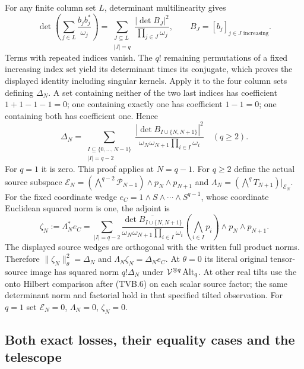 For any finite column set $L$, determinant multilinearity gives
\[
 \det\left(\sum_{j\in L}\frac{b_jb_j^*}{\omega_j}\right)
 =\sum_{\substack{J\subseteq L\\|J|=q}}
       \frac{|\det B_J|^2}{\prod_{j\in J}\omega_j},
 \qquad B_J=[b_j]_{j\in J\text{ increasing}}.
\]
Terms with repeated indices vanish. The $q!$ remaining
permutations of a fixed increasing index set yield its determinant
times its conjugate, which proves the displayed identity including
singular kernels. Apply it to the four column sets defining
$\Delta_N$. A set containing neither of the two last indices has
coefficient $1+1-1-1=0$; one containing exactly one has coefficient
$1-1=0$; one containing both has coefficient one. Hence
\[
 \Delta_N=
 \sum_{\substack{I\subseteq\{0,\ldots,N-1\}\\|I|=q-2}}
 \frac{|\det B_{I\cup\{N,N+1\}}|^2}
      {\omega_N\omega_{N+1}\prod_{i\in I}\omega_i}
 \quad(q\ge2).
 \tag{TVB.30}
\]
For $q=1$ it is zero. This proof applies at $N=q-1$.
For $q\ge2$ define the actual source subspace
$\mathcal E_N=(\bigwedge^{q-2}\mathcal P_{N-1})\wedge p_N\wedge p_{N+1}$
and $\Lambda_N=(\bigwedge^qT_{N+1})|_{\mathcal E_N}$.
For the fixed coordinate wedge $e_C=1\wedge S\wedge\cdots\wedge S^{q-1}$,
whose coordinate Euclidean squared norm is one, the adjoint is
\[
 \zeta_N:=\Lambda_N^*e_C
 =\sum_{|I|=q-2}
 \frac{\overline{\det B_{I\cup\{N,N+1\}}}}
      {\omega_N\omega_{N+1}\prod_{i\in I}\omega_i}
 \left(\bigwedge_{i\in I}p_i\right)\wedge p_N\wedge p_{N+1}.
 \tag{TVB.31}
\]
The displayed source wedges are orthogonal with the written full
product norms. Therefore
$\|\zeta_N\|_\theta^2=\Delta_N$ and
$\Lambda_N\zeta_N=\Delta_Ne_C$.
At $\theta=0$ its literal original tensor-source image has squared
norm $q!\Delta_N$ under $\mathcal V^{\otimes q}\operatorname{Alt}_q$.
At other real tilts use the onto Hilbert comparison after (TVB.6)
on each scalar source factor; the same determinant norm and factorial
hold in that specified tilted observation. For $q=1$ set
$\mathcal E_N=0$, $\Lambda_N=0$, $\zeta_N=0$.

\subsection{Both exact losses, their equality cases and the telescope}

